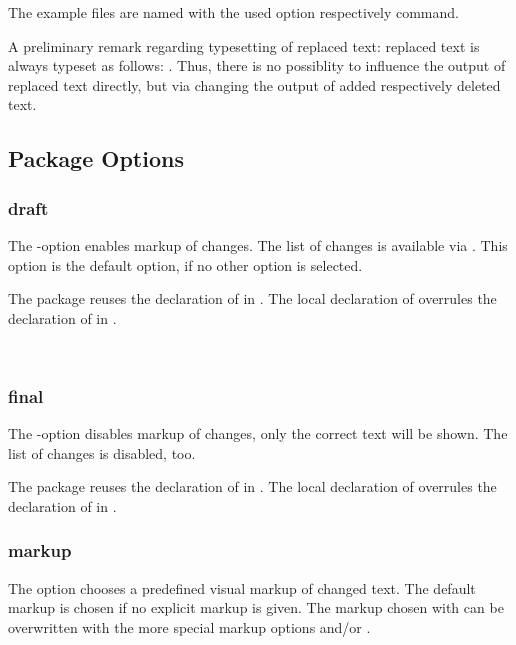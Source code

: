 The example files are named with the used option respectively command.

A preliminary remark regarding typesetting of replaced text: replaced text is always typeset as follows: .
Thus, there is no possiblity to influence the output of replaced text directly, but via changing the output of added respectively deleted text.


\subsection{Package Options}
\label{sec:user:options}

\subsubsection{draft}

The -option enables markup of changes.
The list of changes is available via .
This option is the default option, if no other option is selected.

The  package reuses the declaration of  in .
The local declaration of  overrules the declaration of  in .

 \Corresponds\ 

\subsubsection{final}
The -option disables markup of changes, only the correct text will be shown.
The list of changes is disabled, too.

The  package reuses the declaration of  in .
The local declaration of  overrules the declaration of  in .



\subsubsection{markup}

The  option chooses a predefined visual markup of changed text.
The default markup is chosen if no explicit markup is given.
The markup chosen with  can be overwritten with the more special markup options  and/or .

